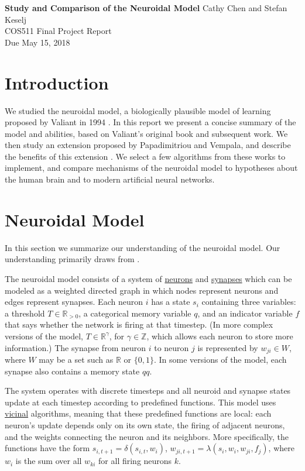\documentclass[letterpaper, 12pt]{article}
\begin{document}
\noindent
\textbf{Study and Comparison of the Neuroidal Model} \hfill \newline Cathy Chen and Stefan Keselj \\
COS511 Final Project Report \\
Due May 15, 2018

\section{Introduction}
We studied the neuroidal model, a biologically plausible model of learning proposed by Valiant in 1994 \cite{valiant_circuits_1994}. In this report we present a concise summary of the model and abilities, based on Valiant's original book and subsequent work. We then study an extension proposed by Papadimitriou and Vempala, and describe the benefits of this extension \cite{papadimitriou_cortical_2015}. We select a few algorithms from these works to implement, and compare mechanisms of the neuroidal model to hypotheses about the human brain and to modern artificial neural networks.

\section{Neuroidal Model}\label{sec:model}
In this section we summarize our understanding of the neuroidal model. Our understanding primarily draws from \cite{valiant_circuits_1994, valiant_memorization_2005, papadimitriou_cortical_2015}.

The neuroidal model consists of a system of \underline{neurons} and \underline{synapses} which can be modeled as a weighted directed graph in which nodes represent neurons and edges represent synapses. Each neuron $i$ has a state $s_i$ containing three variables: a threshold $T\in\mathbb{R}_{>0}$, a categorical memory variable $q$, and an indicator variable $f$ that says whether the network is firing at that timestep. (In more complex versions of the model, $T\in\mathbb{R}^\gamma$, for $\gamma\in\mathbb{Z}$, which allows each neuron to store more information.) The synapse from neuron $i$ to neuron $j$ is represented by $w_{ji}\in W$, where $W$ may be a set such as $\mathbb{R}$ or $\{0,1\}$. In some versions of the model, each synapse also contains a memory state $qq$.

The system operates with discrete timesteps and all neuroid and synapse states update at each timestep according to predefined functions. This model uses \underline{vicinal} algorithms, meaning that these predefined functions are local: each neuron's update depends only on its own state, the firing of adjacent neurons, and the weights connecting the neuron and its neighbors. More specifically, the functions have the form $s_{i,t+1}=\delta(s_{i,t},w_i)$, $w_{ji,t+1}=\lambda(s_i,w_i,w_{ji},f_j)$, where $w_i$ is the sum over all $w_{ki}$ for all firing neurons $k$.
\end{document}
